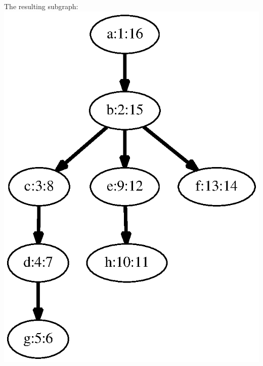 \documentclass{article}
\begin{document}
\begin{minipage}{0.22727272727272727\linewidth}
The resulting subgraph: 
\includegraphics[width=\linewidth]{dfs_directed_classroom_17.eps}
\end{minipage}
\end{document}
